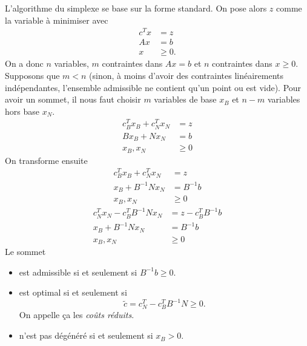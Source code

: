 L'algorithme du simplexe se base sur la forme standard.
On pose alors $z$ comme la variable à minimiser avec
\begin{align*}
  c^T x & = z\\
  Ax & = b\\
  x & \geq 0.
\end{align*}
On a donc $n$ variables,
$m$ contraintes dans $Ax = b$ et
$n$ contraintes dans $x \geq 0$.
Supposons que $m < n$ (sinon, à moins d'avoir des contraintes linéairements
indépendantes, l'ensemble admissible ne contient qu'un point ou est vide).
Pour avoir un sommet, il nous faut choisir
$m$ variables de base $x_B$ et $n-m$ variables hors base $x_N$.
\begin{align*}
  c_B^Tx_B + c_N^Tx_N & = z\\
  Bx_B + Nx_N & = b\\
  x_B,x_N & \geq 0
\end{align*}
On transforme ensuite
\begin{align*}
  c_B^Tx_B + c_N^Tx_N & = z\\
  x_B + B^{-1}Nx_N & = B^{-1}b\\
  x_B, x_N & \geq 0
\end{align*}
\begin{align*}
  c_N^Tx_N-c_B^TB^{-1}Nx_N & = z - c_B^TB^{-1}b\\
  x_B + B^{-1}Nx_N & = B^{-1}b\\
  x_B, x_N & \geq 0
\end{align*}
Le sommet
\begin{itemize}
  \item est admissible si et seulement si $B^{-1}b \geq 0$.
  \item est optimal si et seulement si
    \[ \tilde{c} = c_N^T - c_B^TB^{-1}N \geq 0. \]
    On appelle ça les \emph{coûts réduits}.
  \item n'est pas dégénéré si et seulement si $x_B > 0$.
\end{itemize}
